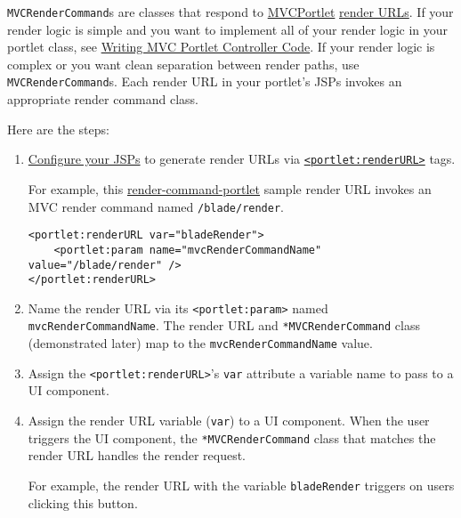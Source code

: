 \texttt{MVCRenderCommand}s are classes that respond to
\href{/docs/7-2/appdev/-/knowledge_base/a/liferay-mvc-portlet}{MVCPortlet}
\href{/docs/7-2/appdev/-/knowledge_base/a/writing-mvc-portlet-controller-code\#render-logic}{render
URLs}. If your render logic is simple and you want to implement all of
your render logic in your portlet class, see
\href{/docs/7-2/appdev/-/knowledge_base/a/liferay-mvc-portlet}{Writing
MVC Portlet Controller Code}. If your render logic is complex or you
want clean separation between render paths, use
\texttt{MVCRenderCommand}s. Each render URL in your portlet's JSPs
invokes an appropriate render command class.

Here are the steps:

\begin{enumerate}
\def\labelenumi{\arabic{enumi}.}
\item
  \href{/docs/7-2/appdev/-/knowledge_base/a/configuring-the-view-layer}{Configure
  your JSPs} to generate render URLs via
  \href{https://docs.liferay.com/dxp/portal/7.2-latest/taglibs/util-taglib/portlet/renderURL.html}{\texttt{\textless{}portlet:renderURL\textgreater{}}}
  tags.

  For example, this
  \href{https://github.com/liferay/liferay-blade-samples/tree/7.1/gradle/apps/render-command-portlet}{render-command-portlet}
  sample render URL invokes an MVC render command named
  \texttt{/blade/render}.

\begin{verbatim}
<portlet:renderURL var="bladeRender">
    <portlet:param name="mvcRenderCommandName" value="/blade/render" />
</portlet:renderURL>
\end{verbatim}
\item
  Name the render URL via its
  \texttt{\textless{}portlet:param\textgreater{}} named
  \texttt{mvcRenderCommandName}. The render URL and
  \texttt{*MVCRenderCommand} class (demonstrated later) map to the
  \texttt{mvcRenderCommandName} value.
\item
  Assign the \texttt{\textless{}portlet:renderURL\textgreater{}}'s
  \texttt{var} attribute a variable name to pass to a UI component.
\item
  Assign the render URL variable (\texttt{var}) to a UI component. When
  the user triggers the UI component, the \texttt{*MVCRenderCommand}
  class that matches the render URL handles the render request.

  For example, the render URL with the variable \texttt{bladeRender}
  triggers on users clicking this button.


\end{enumerate}
